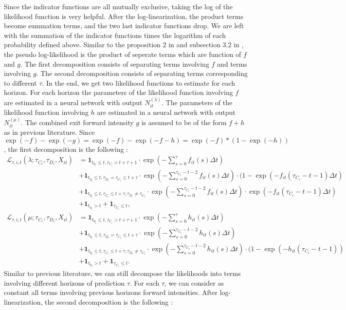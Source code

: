 Since the indicator functions are all mutually exclusive, taking the log of the likelihood function is very helpful. After the log-linearization, the product terms become summation terms, and the two last indicator functions drop. We are left with the summation of the indicator functions times the logarithm of each probability defined above. Similar to the proposition 2 in \citet{DSW} and subsection 3.2 in \citet{Duan2012}, the pseudo log-likelihood is the product of seperate terms which are function of $f$ and $g$. The first decomposition consists of separating terms involving $f$ and terms involving $g$. The second decomposition consists of separating terms corresponding to different $\tau$. In the end, we get two likelihood functions to estimate for each horizon. For each horizon the parameters of the likelihood function involving $f$ are estimated in a neural network with output $N_{it}^{(\lambda)}$. The parameters of the likelihood function involving $h$ are estimated in a neural network with output $N_{it}^{(\mu)}$. The combined exit forward intensity $g$ is assumed to be of the form $f + h$ as in previous literature. Since $\exp(-f)-\exp(-g) = \exp(-f)-\exp(-f-h) = \exp(-f)*(1-\exp(-h))$, the first decomposition is the following :
\begin{align}
    \mathcal{L}_{\tau,i,t}(\lambda; \tau_{C_i},\tau_{D_i}, X_{it}) &= \textbf{1}_{t_{0_i} \leq t, \tau_{C_i} > t+\tau+1} \cdot \exp(-\sum_{s=0}^{\tau} f_{it}(s)\Delta t) \\ \nonumber
    &+ \textbf{1}_{t_{0_i} \leq t, \tau_{D_i}=\tau_{C_i} \leq t+\tau} \cdot \exp(-\sum_{s=0}^{\tau_{C_i}-t-2} f_{it}(s)\Delta t) \cdot (1 - \exp(-f_{it}(\tau_{C_i}-t-1)\Delta t) \\ \nonumber
    &+ \textbf{1}_{t_{0_i} \leq t, \tau_{C_i} \leq t+\tau, \tau_{D_i} \neq \tau_{C_i}} \cdot \exp(-\sum_{s=0}^{\tau_{C_i}-t-2} f_{it}(s) \Delta t) \cdot \exp(-f_{it}(\tau_{C_i}-t-1)\Delta t) \\ \nonumber
    &+ \textbf{1}_{t_{0_i}>t} + \textbf{1}_{\tau_{C_i} \leq t},
\end{align}
\begin{align}
    \mathcal{L}_{\tau,i,t}(\mu; \tau_{C_i},\tau_{D_i}, X_{it}) &= \textbf{1}_{t_{0_i} \leq t, \tau_{C_i} > t+\tau+1} \cdot \exp(-\sum_{s=0}^{\tau} h_{it}(s)\Delta t) \\ \nonumber
    &+ \textbf{1}_{t_{0_i} \leq t, \tau_{D_i}=\tau_{C_i} \leq t+\tau} \cdot \exp(-\sum_{s=0}^{\tau_{C_i}-t-2} h_{it}(s)\Delta t)  \\ \nonumber
    &+ \textbf{1}_{t_{0_i} \leq t, \tau_{C_i} \leq t+\tau, \tau_{D_i} \neq \tau_{C_i}} \cdot \exp(-\sum_{s=0}^{\tau_{C_i}-t-2} h_{it}(s) \Delta t) \cdot (1-\exp(-h_{it}(\tau_{C_i}-t-1)) \\  \nonumber
    &+ \textbf{1}_{t_{0_i}>t} + \textbf{1}_{\tau_{C_i} \leq t}.
\end{align}
Similar to previous literature, we can still decompose the likelihoods into terms involving different horizons of prediction $\tau$. For each $\tau$, we can consider as constant all terms involving previous horizons forward intensities. After log-linearization, the second decomposition is the following :

